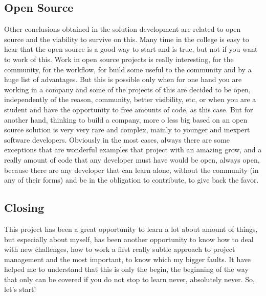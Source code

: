 \subsection{Open Source}

Other conclusions obtained in the solution development are related to open source and the
viability to survive on this. Many time in the college is easy to hear that the
open source is a good way to start and is true, but not if you want to work of
this. Work in open source projects is really interesting, for the community,
for the workflow, for build some useful to the community and by a huge list of
advantages. But this is possible only when for one hand you are working in a
company and some of the projects of this are decided to be open, independently of the
reason, community, better visibility, etc, or when you are a student and have
the opportunity to free amounts of code, as this case. But for another hand,
thinking to build a company, more o less big based on an open source solution
is very very rare and complex, mainly to younger and inexpert software developers.
\linebreak
\linebreak
\noindent Obviously in the most cases, always there are some exceptions that are
wonderful examples that project with an amazing grow, and a really amount of
code that any developer must have would be open, always open, because there
are any developer that can learn alone, without the community (in any of their
forms) and be in the obligation to contribute, to give back the favor.

\subsection{Closing}
This project has been a great opportunity to learn a lot about amount of things,
but especially about myself, has been another opportunity to know how to deal with
new challenges, how to work a first really subtle approach to project management and
the most important, to know which my bigger faults.
It have helped me to understand that this is only the begin, the beginning of
the way that only can be covered if you do not stop to learn never, absolutely never.
\linebreak
\linebreak
\noindent So, let's start!
